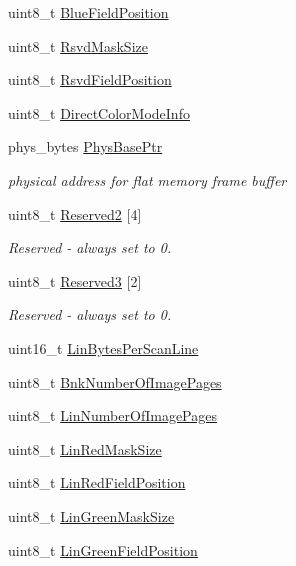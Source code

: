 \begin{DoxyCompactItemize}
\item 
uint8\+\_\+t \hyperlink{group__vbe_ga4d0396c07a4f07556332fec2b4a6c2bf}{Blue\+Field\+Position}
\item 
uint8\+\_\+t \hyperlink{group__vbe_ga87d544680f1132f30b038c0ebf0b829b}{Rsvd\+Mask\+Size}
\item 
uint8\+\_\+t \hyperlink{group__vbe_gaa357b085181776f2918a6df25c88846b}{Rsvd\+Field\+Position}
\item 
uint8\+\_\+t \hyperlink{group__vbe_ga3bf2fd2394ec8649ec3d26104be35dd7}{Direct\+Color\+Mode\+Info}
\item 
phys\+\_\+bytes \hyperlink{group__vbe_ga1d11f4921094db253fc2c2ee6fbb2afb}{Phys\+Base\+Ptr}
\begin{DoxyCompactList}\small\item\em physical address for flat memory frame buffer \end{DoxyCompactList}\item 
uint8\+\_\+t \hyperlink{group__vbe_ga09b5824ec5c67bee2a4b36c0ab5181bc}{Reserved2} \mbox{[}4\mbox{]}
\begin{DoxyCompactList}\small\item\em Reserved -\/ always set to 0. \end{DoxyCompactList}\item 
uint8\+\_\+t \hyperlink{group__vbe_ga2455a82e0d8cc0e8d76e8cf77a68bd39}{Reserved3} \mbox{[}2\mbox{]}
\begin{DoxyCompactList}\small\item\em Reserved -\/ always set to 0. \end{DoxyCompactList}\item 
uint16\+\_\+t \hyperlink{group__vbe_ga53c5060b6ac14a7418ca8421edfb9981}{Lin\+Bytes\+Per\+Scan\+Line}
\item 
uint8\+\_\+t \hyperlink{group__vbe_ga33ba903e149724b1bc99b3b8e43a7cbe}{Bnk\+Number\+Of\+Image\+Pages}
\item 
uint8\+\_\+t \hyperlink{group__vbe_ga3fa2352e69836f4b69b3a344ae761ba8}{Lin\+Number\+Of\+Image\+Pages}
\item 
uint8\+\_\+t \hyperlink{group__vbe_ga1fbcef2402fe6ce7f6c006bd50eaa6da}{Lin\+Red\+Mask\+Size}
\item 
uint8\+\_\+t \hyperlink{group__vbe_gaff962b58f86a77f12b412d47125a4993}{Lin\+Red\+Field\+Position}
\item 
uint8\+\_\+t \hyperlink{group__vbe_gaf235e505028771ab2fb84778f4dfb476}{Lin\+Green\+Mask\+Size}
\item 
uint8\+\_\+t \hyperlink{group__vbe_ga6683a63711dbc5dfb9a2a59c55deecd5}{Lin\+Green\+Field\+Position}

\end{DoxyCompactItemize}
